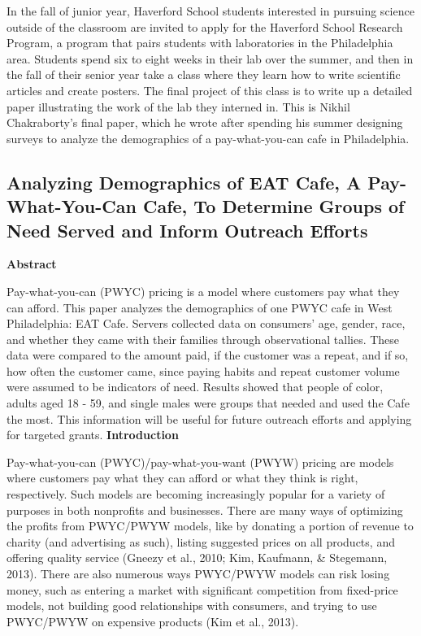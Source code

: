 
In the fall of junior year, Haverford School students interested in pursuing science outside of the classroom are invited to apply for the Haverford School Research Program, a program that pairs students with laboratories in the Philadelphia area. Students spend six to eight weeks in their lab over the summer, and then in the fall of their senior year take a class where they learn how to write scientific articles and create posters. The final project of this class is to write up a detailed paper illustrating the work of the lab they interned in. This is Nikhil Chakraborty’s final paper, which he wrote after spending his summer designing surveys to analyze the demographics of a pay-what-you-can cafe in Philadelphia.

\subsection*{Analyzing Demographics of EAT Cafe, A Pay-What-You-Can Cafe, To Determine Groups of Need Served and Inform Outreach Efforts}

\textbf{Abstract}

Pay-what-you-can (PWYC) pricing is a model where customers pay what they can afford. This paper analyzes the demographics of one PWYC cafe in West Philadelphia: EAT Cafe. Servers collected data on consumers’ age, gender, race, and whether they came with their families through observational tallies. These data were compared to the amount paid, if the customer was a repeat, and if so, how often the customer came, since paying habits and repeat customer volume were assumed to be indicators of need. Results showed that people of color, adults aged 18 - 59, and single males were groups that needed and used the Cafe the most. This information will be useful for future outreach efforts and applying for targeted grants.
\newline\newline\newline
\textbf{Introduction}

Pay-what-you-can (PWYC)/pay-what-you-want (PWYW) pricing are models where customers pay what they can afford or what they think is right, respectively. Such models are becoming increasingly popular for a variety of purposes in both nonprofits and businesses. There are many ways of optimizing the profits from PWYC/PWYW models, like by donating a portion of revenue to charity (and advertising as such), listing suggested prices on all products, and offering quality service (Gneezy et al., 2010; Kim, Kaufmann, \& Stegemann, 2013). There are also numerous ways PWYC/PWYW models can risk losing money, such as entering a market with significant competition from fixed-price models, not building good relationships with consumers, and trying to use PWYC/PWYW on expensive products (Kim et al., 2013).

